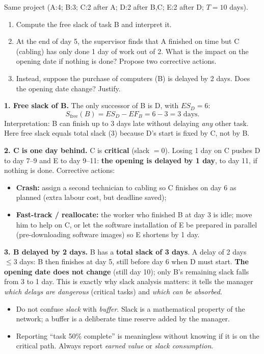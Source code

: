 \documentclass[11pt]{article}
\begin{document}
\begin{exoresolu}
Same project (A:4; B:3; C:2 after A; D:2 after B,C; E:2 after D; $T = 10$ days).
\begin{enumerate}
\item Compute the free slack of task B and interpret it.
\item At the end of day 5, the supervisor finds that A finished on time but C (cabling) has only done 1 day of work out of 2. What is the impact on the opening date if nothing is done? Propose two corrective actions.
\item Instead, suppose the purchase of computers (B) is delayed by 2 days. Does the opening date change? Justify.
\end{enumerate}
\tcblower
\textbf{1. Free slack of B.} The only successor of B is D, with $ES_D = 6$:
\[ S_{\text{free}}(B) = ES_D - EF_B = 6 - 3 = 3 \text{ days}. \]
Interpretation: B can finish up to 3 days late without delaying \emph{any} other task. Here free slack equals total slack (3) because D's start is fixed by C, not by B.

\textbf{2. C is one day behind.} C is \textbf{critical} (slack $= 0$). Losing 1 day on C pushes D to day 7--9 and E to day 9--11: \textbf{the opening is delayed by 1 day}, to day 11, if nothing is done. Corrective actions:
\begin{itemize}
\item \textbf{Crash:} assign a second technician to cabling so C finishes on day 6 as planned (extra labour cost, but deadline saved);
\item \textbf{Fast-track / reallocate:} the worker who finished B at day 3 is idle; move him to help on C, or let the software installation of E be prepared in parallel (pre-downloading software images) so E shortens by 1 day.
\end{itemize}

\textbf{3. B delayed by 2 days.} B has a \textbf{total slack of 3 days}. A delay of 2 days $\le 3$ days: B then finishes at day 5, still before day 6 when D must start. \textbf{The opening date does not change} (still day 10); only B's remaining slack falls from 3 to 1 day. This is exactly why slack analysis matters: it tells the manager \emph{which delays are dangerous} (critical tasks) and \emph{which can be absorbed}.
\end{exoresolu}

\begin{attention}
\begin{itemize}
\item Do not confuse \emph{slack} with \emph{buffer}. Slack is a mathematical property of the network; a buffer is a deliberate time reserve added by the manager.
\item Reporting ``task 50\% complete'' is meaningless without knowing if it is on the critical path. Always report \emph{earned value} or \emph{slack consumption}.
\end{itemize}
\end{attention}
\end{document}
